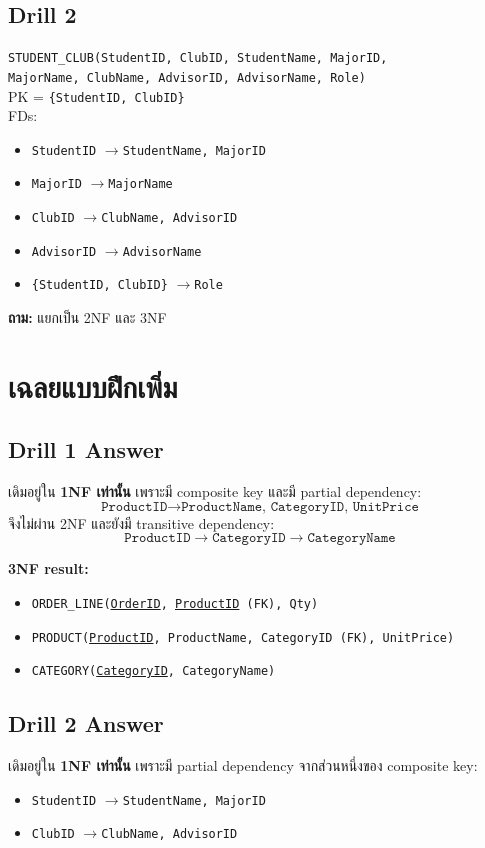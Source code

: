 \documentclass[a4paper,12pt]{article}
\newcommand{\pk}[1]{\uline{#1}}
\newcommand{\fd}{\(\rightarrow\)}
\newcommand{\schema}[1]{\texttt{#1}}
\begin{document}
\subsection*{Drill 2}
\schema{STUDENT\_CLUB(StudentID, ClubID, StudentName, MajorID,}\\
\schema{MajorName, ClubName, AdvisorID, AdvisorName, Role)}\\
PK = \schema{\{StudentID, ClubID\}}\\
FDs:
\begin{itemize}
    \item \schema{StudentID} \fd \schema{StudentName, MajorID}
    \item \schema{MajorID} \fd \schema{MajorName}
    \item \schema{ClubID} \fd \schema{ClubName, AdvisorID}
    \item \schema{AdvisorID} \fd \schema{AdvisorName}
    \item \schema{\{StudentID, ClubID\}} \fd \schema{Role}
\end{itemize}

\textbf{ถาม:} แยกเป็น 2NF และ 3NF
\vspace{4.0cm}

\newpage
\section*{เฉลยแบบฝึกเพิ่ม}

\subsection*{Drill 1 Answer}
เดิมอยู่ใน \textbf{1NF เท่านั้น} เพราะมี composite key และมี partial dependency:
\[
\schema{ProductID} \rightarrow \schema{ProductName, CategoryID, UnitPrice}
\]
จึงไม่ผ่าน 2NF และยังมี transitive dependency:
\[
\schema{ProductID} \rightarrow \schema{CategoryID} \rightarrow \schema{CategoryName}
\]

\textbf{3NF result:}
\begin{itemize}
    \item \schema{ORDER\_LINE(\pk{OrderID}, \pk{ProductID} (FK), Qty)}
    \item \schema{PRODUCT(\pk{ProductID}, ProductName, CategoryID (FK), UnitPrice)}
    \item \schema{CATEGORY(\pk{CategoryID}, CategoryName)}
\end{itemize}

\subsection*{Drill 2 Answer}
เดิมอยู่ใน \textbf{1NF เท่านั้น} เพราะมี partial dependency จากส่วนหนึ่งของ composite key:
\begin{itemize}
    \item \schema{StudentID} \fd \schema{StudentName, MajorID}
    \item \schema{ClubID} \fd \schema{ClubName, AdvisorID}
\end{itemize}
\end{document}
